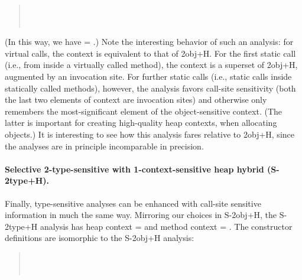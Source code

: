 \begin{quote}
 \\
 \\
\end{quote}

(In this way, we have  = .) Note the interesting behavior of such an analysis: for virtual calls, the context is equivalent to that of 2obj+H. For the first static call (i.e., from inside a virtually called method), the context is a superset of 2obj+H, augmented by an invocation site. For further static calls (i.e., static calls inside statically called methods), however, the analysis favors call-site sensitivity (both the last two elements of context are invocation sites) and otherwise only remembers the most-significant element of the object-sensitive context. (The latter is important for creating high-quality heap contexts, when allocating objects.) It is interesting to see how this analysis fares relative to 2obj+H, since the analyses are in principle incomparable in precision.

\paragraph[Selective 2-type-sensitive with 1-context-sensitive heap]{Selective 2-type-sensitive with 1-context-sensitive heap hybrid (S-2type+H).}
Finally, type-sensitive analyses can be enhanced with call-site sensitive information in much the same way. Mirroring our choices in S-2obj+H, the S-2type+H analysis has heap context  =  and method context  = . The constructor definitions are isomorphic to the S-2obj+H analysis:

\begin{quote}
 \\
 \\
\end{quote}

